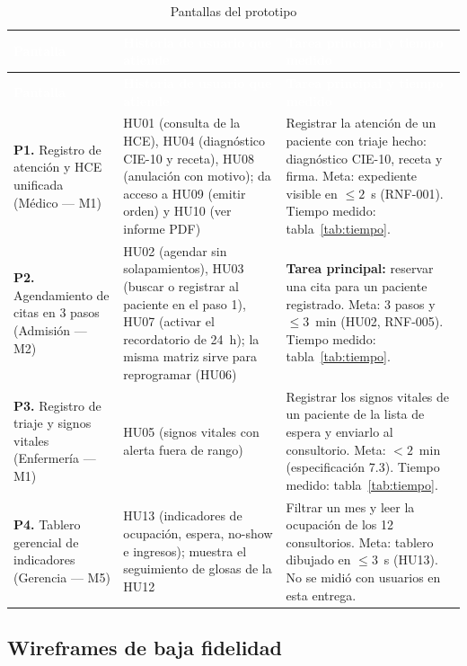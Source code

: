 \documentclass[11pt,a4paper]{article}
\newcommand{\cab}[1]{\textcolor{white}{\textbf{#1}}}
\begin{document}
\begin{xltabular}{\linewidth}{|P{4cm}|L|L|}
  \caption{Pantallas del prototipo}\label{tab:pantallas}\\
  \hline
  \cab{Pantalla} & \cab{Historia de usuario que atiende} & \cab{Tarea principal y tiempo medido} \\ \hline
  \endfirsthead
  \hline
  \cab{Pantalla} & \cab{Historia de usuario que atiende} & \cab{Tarea principal y tiempo medido} \\ \hline
  \endhead
  \textbf{P1.} Registro de atención y HCE unificada \newline (Médico --- M1) &
    HU01 (consulta de la HCE), HU04 (diagnóstico CIE-10 y receta), HU08 (anulación con motivo);
    da acceso a HU09 (emitir orden) y HU10 (ver informe PDF) &
    Registrar la atención de un paciente con triaje hecho: diagnóstico CIE-10, receta y firma.
    Meta: expediente visible en $\leq 2$~s (RNF-001). Tiempo medido: tabla~\ref{tab:tiempo}. \\ \hline
  \textbf{P2.} Agendamiento de citas en 3 pasos \newline (Admisión --- M2) &
    HU02 (agendar sin solapamientos), HU03 (buscar o registrar al paciente en el paso 1),
    HU07 (activar el recordatorio de 24~h); la misma matriz sirve para reprogramar (HU06) &
    \textbf{Tarea principal:} reservar una cita para un paciente registrado. Meta: 3 pasos y
    $\leq 3$~min (HU02, RNF-005). Tiempo medido: tabla~\ref{tab:tiempo}. \\ \hline
  \textbf{P3.} Registro de triaje y signos vitales \newline (Enfermería --- M1) &
    HU05 (signos vitales con alerta fuera de rango) &
    Registrar los signos vitales de un paciente de la lista de espera y enviarlo al consultorio.
    Meta: $< 2$~min (especificación 7.3). Tiempo medido: tabla~\ref{tab:tiempo}. \\ \hline
  \textbf{P4.} Tablero gerencial de indicadores \newline (Gerencia --- M5) &
    HU13 (indicadores de ocupación, espera, no-show e ingresos); muestra el seguimiento de
    glosas de la HU12 &
    Filtrar un mes y leer la ocupación de los 12 consultorios. Meta: tablero dibujado en
    $\leq 3$~s (HU13). No se midió con usuarios en esta entrega. \\ \hline
\end{xltabular}

\subsection{Wireframes de baja fidelidad}
\end{document}

